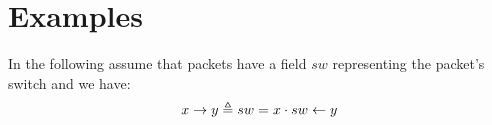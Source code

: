 \section{Examples}

In the following assume that packets have a field $sw$
representing the packet's switch and we have:
\begin{equation*}
    x \rightarrow y \triangleq sw = x \cdot sw \leftarrow y
\end{equation*}



% 

% 